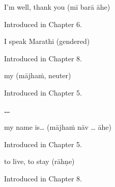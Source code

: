 \noindent\begin{minipage}[t]{\linewidth}
\raggedright
\textbf{  }\par
\small I'm well, thank you (mī barā āhe)\par
\footnotesize Introduced in Chapter 6.
\end{minipage}\par\medskip

\noindent\begin{minipage}[t]{\linewidth}
\raggedright
\textbf{  }\par
\small I speak Marathi (gendered)\par
\footnotesize Introduced in Chapter 8.
\end{minipage}\par\medskip

\noindent\begin{minipage}[t]{\linewidth}
\raggedright
\textbf{}\par
\small my (mājhaṁ, neuter)\par
\footnotesize Introduced in Chapter 5.
\end{minipage}\par\medskip

\noindent\begin{minipage}[t]{\linewidth}
\raggedright
\textbf{  … }\par
\small my name is… (mājhaṁ nāv … āhe)\par
\footnotesize Introduced in Chapter 5.
\end{minipage}\par\medskip

\noindent\begin{minipage}[t]{\linewidth}
\raggedright
\textbf{}\par
\small to live, to stay (rāhṇe)\par
\footnotesize Introduced in Chapter 8.
\end{minipage}\par\medskip
